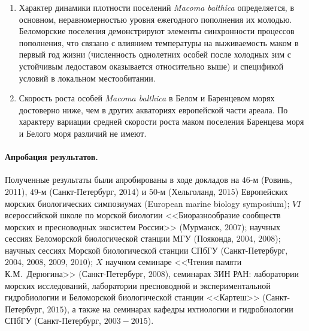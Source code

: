 \begin{enumerate}
\item Характер динамики плотности поселений \textit{Macoma balthica} определяется, в основном, неравномерностью  уровня ежегодного пополнения их молодью. 
Беломорские поселения демонстрируют элементы синхронности процессов пополнения, что связано с влиянием температуры на выживаемость маком в первый год жизни  (численность однолетних особей после холодных зим с устойчивым ледоставом оказывается относительно выше) и спецификой условий в локальном местообитании.

\item Скорость роста особей \textit{Macoma balthica} в Белом и Баренцевом морях достоверно ниже, чем в других акваториях европейской части ареала. 
По характеру вариации средней скорости роста маком поселения Баренцева моря и Белого моря различий не имеют. 

\end{enumerate}
%
%
\paragraph{Апробация результатов.}

Полученные результаты были апробированы в ходе докладов на 
$46$-м (Ровинь, 2011), $49$-м (Санкт-Петербург, $2014$) и $50$-м (Хельголанд, $2015$) Европейских морских биологических симпозиумах (European marine biology symposium); 
$VI$ всероссийской школе по морской биологии <<Биоразнообразие сообществ морских и пресноводных экосистем России>> (Мурманск, $2007$); 
научных сессиях Беломорской биологической станции МГУ (Пояконда, $2004$, $2008$); 
научных сессиях Морской биологической станции СПбГУ (Санкт-Петербург, $2004$, $2008$, $2009$, $2010$); 
$X$ научном семинаре <<Чтения памяти К.М.~Дерюгина>> (Санкт-Петербург, $2008$),
семинарах ЗИН РАН: лаборатории морских исследований, лаборатории пресноводной и экспериментальной гидробиологии и Беломорской биологической станции <<Картеш>> (Санкт-Петербург, $2015$),
а также на семинарах кафедры  ихтиологии и гидробиологии СПбГУ (Санкт-Петербург, $2003 - 2015$).

